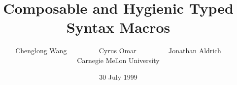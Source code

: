 \documentclass{sig-alternate}
\begin{document}
%

\title{Composable and Hygienic Typed Syntax Macros}
%
%
%
%
%

%
\author{
%
%
\alignauthor
Chenglong Wang ~~~~~~~~ Cyrus Omar ~~~~~~~~ Jonathan Aldrich \\ Carnegie Mellon University \\ 
}

\date{30 July 1999}
\end{document}
